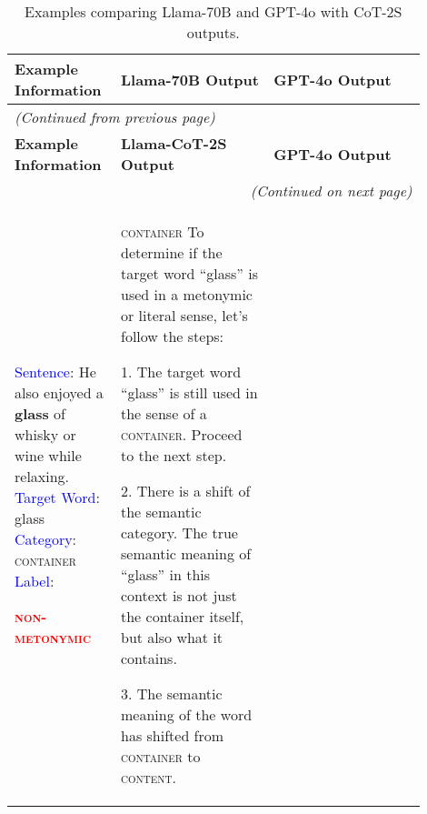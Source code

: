 \documentclass[11pt]{article}
\newcommand{\tr}[1]{\textcolor{red}{#1}}
\newcommand{\tb}[1]{\textcolor{blue}{#1}}
\begin{document}
\begingroup
\renewcommand\baselinestretch{0.9}


\begingroup
\renewcommand{\arraystretch}{2}
\onecolumn
{\small
\begin{longtable}{|p{0.20\linewidth}|p{0.35\linewidth}|p{0.35\linewidth}|}
\caption{Examples comparing Llama-70B and GPT-4o with CoT-2S outputs.}\label{tab:3col-example}\\

\hline
\bf Example Information & \bf Llama-70B Output & \bf GPT-4o Output \\
\hline
\endfirsthead

\multicolumn{3}{l}{\textit{(Continued from previous page)}}\\
\hline
\bf Example Information & \bf Llama-CoT-2S Output & \bf GPT-4o Output \\
\hline
\endhead

\hline
\multicolumn{3}{r}{\textit{(Continued on next page)}}\\
\hline
\endfoot

\hline
\endlastfoot


\tb{Sentence}: He also enjoyed a \textbf{glass} of whisky or wine while relaxing. \newline
\tb{Target Word}: glass \newline
\tb{Category}: \textsc{container} \newline
\tb{Label}: 

\tr{\textsc{\textbf{non-metonymic}}}

&

\textsc{container} \newline
To determine if the target word ``glass'' is used in a metonymic or literal sense, let's follow the steps:

1. The target word ``glass'' is still used in the sense of a \textsc{container}. Proceed to the next step.

2. There is a shift of the semantic category. The true semantic meaning of ``glass'' in this context is not just the container itself, but also what it contains.

3. The semantic meaning of the word has shifted from \textsc{container} to \textsc{content}.


\end{longtable}}
\end{document}
